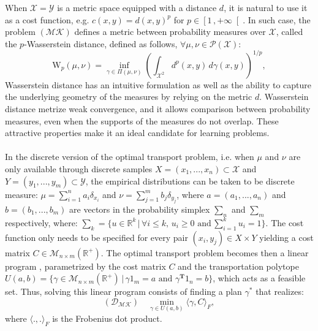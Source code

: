 \documentclass[conference]{IEEEtran}
\begin{document}
When $\mathcal{X}=\mathcal{Y}$ is a metric space equipped with a distance $d$, it is natural to use it as a cost function, e.g. $c(x, y) = d(x, y)^p$ for $p \in {\left[1\,,+\infty\right[}$. In such case, the problem $(\mathcal{MK})$ defines a metric between probability measures over $\mathcal{X}$, called the $p$-Wasserstein distance, defined as follows,  $\forall \mu,\nu \in \mathcal{P}(\mathcal{X})$:
\begin{equation}
    \mathrm{W}_{p}(\mu,\nu) = \underset{\gamma \in \Pi(\mu,\nu)}{\inf} (\int_{\mathcal{X}^{2}} d^{p}(x,y) \, d\gamma(x,y))^{1/p}, 
\end{equation}
Wasserstein distance has an intuitive formulation as well as the ability to capture the underlying geometry of the measures by relying on the metric $d$. Wasserstein distance metrize weak convergence, and it allows comparison between probability measures, even when the supports of the measures do not overlap. These attractive properties make it an ideal candidate for learning problems.
\\
\\ In the discrete version of the optimal transport problem, i.e. when $\mu$ and $\nu$ are only available through discrete samples $X = (x_1,...,x_n) \subset \mathcal{X}$ and $Y = (y_1,...,y_m) \subset \mathcal{Y}$, the empirical distributions can be taken to be discrete measure: $\mu = \sum_{i=1}^n a_{i} \delta_{x_{i}}$ and
$\nu = \sum_{j=1}^m b_{j} \delta_{y_{j}}$, where  $a=(a_1,...,a_n)$ and $b=(b_1,...,b_m)$ are vectors in the probability simplex $\sum_n$ and $\sum_m$ respectively, where: $\sum_k = \{ u \in \mathbb{R}^k \, | \, \forall i \le k, \, u_i \ge 0 \, \,\text{and} \, \sum_{i=1}^k   u_i =1 \}$. The cost function only needs to be specified for every
pair $(x_i,y_j) \in X \times Y$ yielding a cost matrix $C \in  \mathcal{M}_{n \times m}(\mathbb{R}^{+})$. The optimal transport problem becomes then a linear program \cite{bertsimas1997introduction}, parametrized by the cost matrix $C$ and the transportation polytope $U(a,b) = \{\gamma \in \mathcal{M}_{n \times m}(\mathbb{R}^{+}) \, | \, \gamma 1_{m} = a \,\, \text{and} \,\, \gamma^{\mathbf{T}} 1_{n} = b\}$, which acts as a feasible set. Thus, solving this linear program consists of finding a plan $\gamma^*$ that realizes:
\begin{equation}
(\mathcal{D}_\mathcal{MK}) \,\,\,\,\,\,\underset{\gamma \in U(a,b)}{\min}  \langle {\gamma},{C} \rangle _F,
\end{equation}
where $\langle.,.\rangle_F$ is the Frobenius dot product.
\\ 
\end{document}

